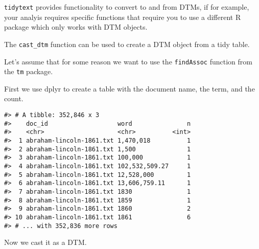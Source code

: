 \documentclass[]{book}
\newenvironment{Shaded}{\begin{snugshade}}{\end{snugshade}}
\newcommand{\CommentTok}[1]{\textcolor[rgb]{0.56,0.35,0.01}{\textit{#1}}}
\newcommand{\KeywordTok}[1]{\textcolor[rgb]{0.13,0.29,0.53}{\textbf{#1}}}
\newcommand{\NormalTok}[1]{#1}
\newcommand{\OperatorTok}[1]{\textcolor[rgb]{0.81,0.36,0.00}{\textbf{#1}}}
\newcommand{\StringTok}[1]{\textcolor[rgb]{0.31,0.60,0.02}{#1}}
\begin{document}
\texttt{tidytext} provides functionality to convert to and from DTMs, if for example, your analyis requires specific functions that require you to use a different R package which only works with DTM objects.

The \texttt{cast\_dtm} function can be used to create a DTM object from a tidy table.

Let's assume that for some reason we want to use the \texttt{findAssoc} function from the \texttt{tm} package.

First we use dplyr to create a table with the document name, the term, and the count.

\begin{Shaded}
\end{Shaded}

\begin{verbatim}
#> # A tibble: 352,846 x 3
#>    doc_id                   word               n
#>    <chr>                    <chr>          <int>
#>  1 abraham-lincoln-1861.txt 1,470,018          1
#>  2 abraham-lincoln-1861.txt 1,500              1
#>  3 abraham-lincoln-1861.txt 100,000            1
#>  4 abraham-lincoln-1861.txt 102,532,509.27     1
#>  5 abraham-lincoln-1861.txt 12,528,000         1
#>  6 abraham-lincoln-1861.txt 13,606,759.11      1
#>  7 abraham-lincoln-1861.txt 1830               1
#>  8 abraham-lincoln-1861.txt 1859               1
#>  9 abraham-lincoln-1861.txt 1860               2
#> 10 abraham-lincoln-1861.txt 1861               6
#> # ... with 352,836 more rows
\end{verbatim}

Now we cast it as a DTM.

\begin{Shaded}
\end{Shaded}
\end{document}
